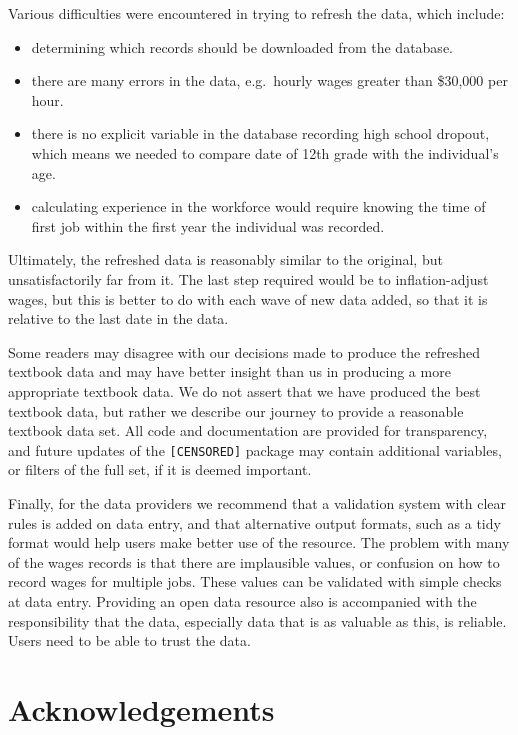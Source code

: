\documentclass{article}
\providecommand{\tightlist}{%
  \setlength{\itemsep}{0pt}\setlength{\parskip}{0pt}}
\begin{document}
Various difficulties were encountered in trying to refresh the data, which include:

\begin{itemize}
\tightlist
\item
  determining which records should be downloaded from the database.
\item
  there are many errors in the data, e.g.~hourly wages greater than \$30,000 per hour.
\item
  there is no explicit variable in the database recording high school dropout, which means we needed to compare date of 12th grade with the individual's age.
\item
  calculating experience in the workforce would require knowing the time of first job within the first year the individual was recorded.
\end{itemize}

Ultimately, the refreshed data is reasonably similar to the original, but unsatisfactorily far from it. The last step required would be to inflation-adjust wages, but this is better to do with each wave of new data added, so that it is relative to the last date in the data.

Some readers may disagree with our decisions made to produce the refreshed textbook data and may have better insight than us in producing a more appropriate textbook data. We do not assert that we have produced the best textbook data, but rather we describe our journey to provide a reasonable textbook data set. All code and documentation are provided for transparency, and future updates of the \texttt{[CENSORED]} package may contain additional variables, or filters of the full set, if it is deemed important.

Finally, for the data providers we recommend that a validation system with clear rules is added on data entry, and that alternative output formats, such as a tidy format would help users make better use of the resource. The problem with many of the wages records is that there are implausible values, or confusion on how to record wages for multiple jobs. These values can be validated with simple checks at data entry. Providing an open data resource also is accompanied with the responsibility that the data, especially data that is as valuable as this, is reliable. Users need to be able to trust the data.

\hypertarget{acknowledgements}{%
\section{Acknowledgements}\label{acknowledgements}}
\end{document}
